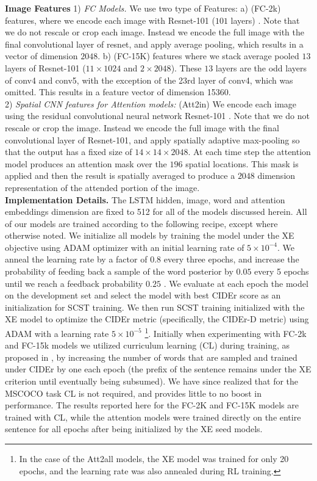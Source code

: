 \documentclass[10pt,twocolumn,letterpaper]{article}
\begin{document}
\noindent \textbf{Image Features}
1) \emph{FC Models.} We use two type of Features: a) (FC-2k) features, where we encode each image with Resnet-101 ($101$ layers) \cite{he15deepresidual}. Note that we do not rescale or crop each image. Instead we encode the full image with the final convolutional layer of resnet, and apply average pooling, which results in a vector of dimension $2048$. b) (FC-15K) features where we  stack average pooled  $13$ layers  of Resnet-101 ($11\times1024$ and $2\times2048$). These $13$ layers are the odd layers of conv4 and conv5, with the exception of the 23rd layer of conv4, which was omitted. This results in a feature vector of dimension 15360.\\
2) \emph{Spatial  CNN features for Attention models:} (Att2in) We encode each image using the residual convolutional neural network Resnet-101 \cite{he15deepresidual}. Note that we do not rescale or crop the image. Instead we encode the full image with the final convolutional layer of Resnet-101, and apply spatially adaptive max-pooling so that the output has a fixed  size of $14\times 14 \times 2048$. At each time step the attention model produces an attention mask over the $196$ spatial locations. This mask is applied and then the result is spatially averaged to produce a $2048$ dimension representation of the attended portion of the image. \\

\noindent \textbf{Implementation Details.} The LSTM hidden, image, word and attention embeddings dimension are fixed to 512 for all of the models discussed herein. All of our models are trained according to the following recipe, except where otherwise noted. We initialize all models by training the model under the XE objective using ADAM \cite{ADAM} optimizer with an initial learning rate of $5\times 10^{-4}$. We anneal the learning rate by a factor of $0.8$ every three epochs, and increase the probability of feeding back a sample of the word posterior by $0.05$ every 5 epochs until we reach a feedback probability $0.25$ \cite{ScheduledSampling}. We evaluate at each epoch the model on the development set and select the model with best CIDEr score as an initialization for SCST training. We then run SCST training initialized with the XE model to optimize the CIDEr metric (specifically, the CIDEr-D metric) using ADAM with a learning rate $5\times10^{-5}$ \footnote{In the case of the Att2all models, the XE model was trained for only 20 epochs, and the learning rate was also annealed during RL training.}. 
Initially when experimenting with FC-2k and FC-15k models we utilized curriculum learning (CL) during training, as proposed in \cite{Ranzato}, by increasing the number of words that are sampled and trained under CIDEr by one each epoch (the prefix of the sentence remains under the XE criterion until eventually being subsumed). We have since realized that for the MSCOCO task CL is not required, and provides little to no boost in performance. The results reported here for the FC-2K and FC-15K models are trained with CL, while the attention models were trained directly on the entire sentence for all epochs after being initialized by the XE seed models.
\end{document}
